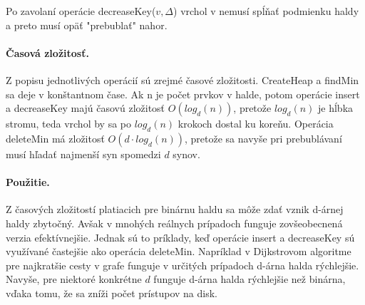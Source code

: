 Po zavolaní operácie decreaseKey($v, \Delta$) vrchol v nemusí spĺňať podmienku haldy a preto musí opäť 
"prebublať" nahor.

\paragraph{Časová zložitosť.}
Z popisu jednotlivých operácií sú zrejmé časové zložitosti. CreateHeap a findMin sa deje v konštantnom čase.
Ak n je počet prvkov v halde, potom operácie insert a decreaseKey majú časovú zložitosť $O(log_d(n))$, pretože 
$log_d(n)$ je hĺbka stromu, teda vrchol by sa po $log_d(n)$ krokoch dostal ku koreňu. Operácia deleteMin má 
zložitosť $O(d\cdot log_d(n))$, pretože sa navyše pri prebublávaní musí hľadať najmenší syn spomedzi $d$ synov.

\paragraph{Použitie.}
Z časových zložitostí platiacich pre binárnu haldu sa môže zdať vznik d-árnej haldy zbytočný. Avšak v mnohých 
reálnych prípadoch funguje zovšeobecnená verzia efektívnejšie. 
Jednak sú to príklady, keď operácie insert a decreaseKey sú využívané častejšie ako operácia deleteMin. Napríklad 
v Dijkstrovom algoritme pre najkratšie cesty v grafe funguje v určitých prípadoch d-árna halda rýchlejšie.
Navyše, pre niektoré konkrétne $d$ funguje d-árna halda rýchlejšie než binárna, vďaka tomu, že sa zníži počet 
prístupov na disk.

